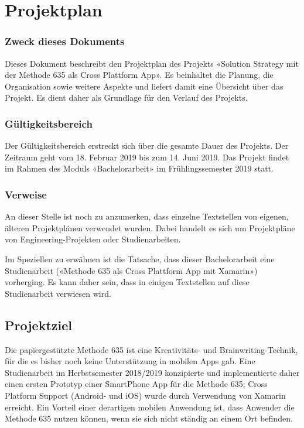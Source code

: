 \section{Projektplan}

\subsubsection*{Zweck dieses Dokuments}
Dieses Dokument beschreibt den Projektplan des Projekts «Solution Strategy mit der Methode 635 als Cross Plattform App». Es beinhaltet die Planung, die Organisation sowie weitere Aspekte und liefert damit eine Übersicht über das Projekt. Es dient daher als Grundlage für den Verlauf des Projekts.

\subsubsection*{Gültigkeitsbereich}
Der Gültigkeitsbereich erstreckt sich über die gesamte Dauer des Projekts. Der Zeitraum geht vom 18. Februar 2019 bis zum 14. Juni 2019. Das Projekt findet im Rahmen des Moduls «Bachelorarbeit» im Frühlingssemester 2019 statt.

\subsubsection*{Verweise}
An dieser Stelle ist noch zu anzumerken, dass einzelne Textstellen von eigenen, älteren Projektplänen verwendet wurden. Dabei handelt es sich um Projektpläne von Engineering-Projekten oder Studienarbeiten.

Im Speziellen zu erwähnen ist die Tatsache, dass dieser Bachelorarbeit eine Studienarbeit («Methode 635 als Cross Plattform App mit Xamarin») vorherging. Es kann daher sein, dass in einigen Textstellen auf diese Studienarbeit verwiesen wird. 

\subsection{Projektziel}
Die papiergestützte Methode 635 ist eine Kreativitäts- und Brainwriting-Technik, für die es bisher noch keine Unterstützung in mobilen Apps gab. Eine Studienarbeit im Herbstsemester 2018/2019 konzipierte und implementierte daher einen ersten Prototyp einer SmartPhone App für die Methode 635; Cross Platform Support (Android- und iOS) wurde durch Verwendung von Xamarin erreicht. Ein Vorteil einer derartigen mobilen Anwendung ist, dass Anwender die Methode 635 nutzen können, wenn sie sich nicht ständig an einem Ort befinden.
 
